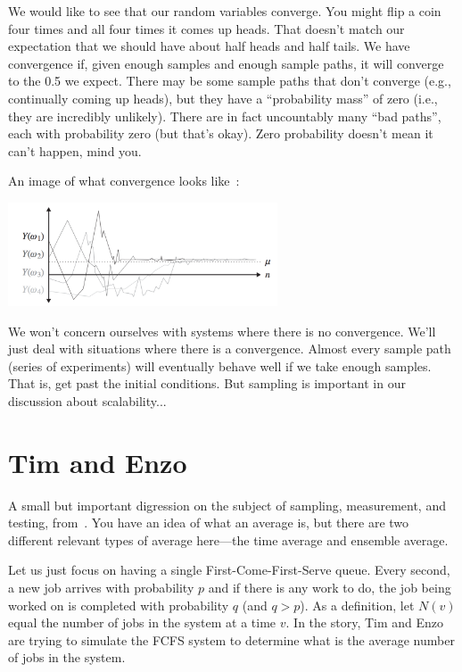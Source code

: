 We would like to see that our random variables converge. You might flip a coin four times and all four times it comes up heads. That doesn't match our expectation that we should have about half heads and half tails. We have convergence if, given enough samples and enough sample paths, it will converge to the 0.5 we expect. There may be some sample paths that don't converge (e.g., continually coming up heads), but they have a ``probability mass'' of zero (i.e., they are incredibly unlikely).  There are in fact uncountably many ``bad paths'', each with probability zero (but that's okay). Zero probability doesn't mean it can't happen, mind you.

An image of what convergence looks like~\cite{pmd}:

\begin{center}
	\includegraphics[width=0.6\textwidth]{images/convergence.png}
\end{center}

We won't concern ourselves with systems where there is no convergence. We'll just deal with situations where there is a convergence. Almost every sample path (series of experiments) will eventually behave well if we take enough samples. That is, get past the initial conditions. But sampling is important in our discussion about scalability...

\section*{Tim and Enzo}
A small but important digression on the subject of sampling, measurement, and testing, from~\cite{pmd}. You have an idea of what an average is, but there are two different relevant types of average here---the time average and ensemble average. 

Let us just focus on having a single First-Come-First-Serve queue. Every second, a new job arrives with probability $p$ and if there is any work to do, the job being worked on is completed with probability $q$ (and $q > p$). As a definition, let $N(v)$ equal the number of jobs in the system at a time $v$. In the story, Tim and Enzo are trying to simulate the FCFS system to determine what is the average number of jobs in the system. 

